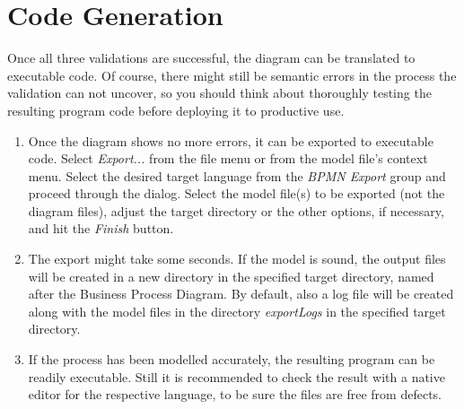 \section{Code Generation}
\label{sec:user_tut_export}
	
Once all three validations are successful, the diagram can be translated to executable code.  Of course, there might still be semantic errors in the process the validation can not uncover, so you should think about thoroughly testing the resulting program code before deploying it to productive use.
	
\begin{enumerate}

	\item Once the diagram shows no more errors, it can be exported to executable code.  Select \emph{Export...} from the file menu or from the model file's context menu.  Select the desired target language from the \emph{BPMN Export} group and proceed through the dialog.  Select the model file(s) to be exported (not the diagram files), adjust the target directory or the other options, if necessary, and hit the \emph{Finish} button.
	
	\item The export might take some seconds.  If the model is sound, the output files will be created in a new directory in the specified target directory, named after the Business Process Diagram. By default, also a log file will be created along with the model files in the directory \emph{exportLogs} in the specified target directory.
	
	\item If the process has been modelled accurately, the resulting program can be readily executable. Still it is recommended to check the result with a native editor for the respective language, to be sure the files are free from defects.

\end{enumerate}

